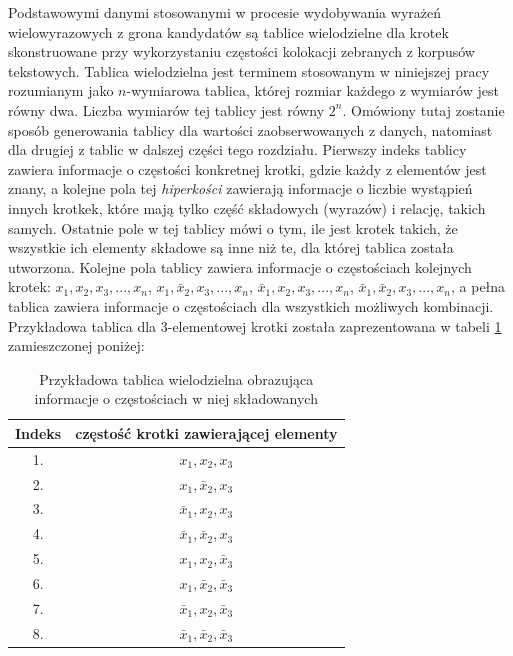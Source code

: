 \documentclass[11pt,a4paper]{llncs}
\begin{document}
Podstawowymi danymi stosowanymi w procesie wydobywania wyrażeń wielowyrazowych z grona kandydatów są tablice wielodzielne dla krotek skonstruowane przy wykorzystaniu częstości kolokacji zebranych z korpusów tekstowych.
Tablica wielodzielna jest terminem stosowanym w niniejszej pracy rozumianym jako $n$-wymiarowa tablica, której rozmiar każdego z wymiarów jest równy dwa.
Liczba wymiarów tej tablicy jest równy $ 2^{n} $.
Omówiony tutaj zostanie sposób generowania tablicy dla wartości zaobserwowanych z danych, natomiast dla drugiej z tablic w dalszej części tego rozdziału.
Pierwszy indeks tablicy zawiera informacje o częstości konkretnej krotki, gdzie każdy z elementów jest znany, a kolejne pola tej  \emph{hiperkości} zawierają informacje o liczbie wystąpień innych krotkek, które mają tylko część składowych (wyrazów) i relację, takich samych.
Ostatnie pole w tej tablicy mówi o tym, ile jest krotek takich, że wszystkie ich elementy składowe są inne niż te, dla której tablica została utworzona.
Kolejne pola tablicy zawiera informacje o częstościach kolejnych krotek: $ x_{1}, x_{2}, x_{3}, ..., x_{n} $, $ x_{1}, \bar{x}_{2}, x_{3}, ..., x_{n} $, $ \bar{x}_{1}, x_{2}, x_{3}, ..., x_{n} $, $ \bar{x}_{1}, \bar{x}_{2}, x_{3}, ..., x_{n} $, a pełna tablica zawiera informacje o częstościach dla wszystkich możliwych kombinacji.
Przykładowa tablica dla 3-elementowej krotki została zaprezentowana w tabeli \ref{observed_contingency_table} zamieszczonej poniżej:

\begin{table}[h!]
\centering
\begin{tabular}{c | c}
	\toprule
	Indeks	& częstość krotki zawierającej elementy									\\
	\midrule
	1. 		& \( x_{1}, 		x_{2}, 			x_{3} \)		\\
	2. 		& \( x_{1}, 		\bar{x}_{2}, 	x_{3} \)		\\
	3. 		& \( \bar{x}_{1}, 	x_{2}, 			x_{3} \)		\\
	4. 		& \( \bar{x}_{1}, 	\bar{x}_{2}, 	x_{3} \)		\\
	5. 		& \( x_{1}, 		x_{2}, 			\bar{x}_{3} \)	\\
	6. 		& \( x_{1}, 		\bar{x}_{2}, 	\bar{x}_{3} \)	\\
	7. 		& \( \bar{x}_{1}, 	x_{2}, 			\bar{x}_{3} \)	\\
	8. 		& \( \bar{x}_{1}, 	\bar{x}_{2}, 	\bar{x}_{3} \)	\\
	\bottomrule
\end{tabular}
\caption[Tablica wielodzielna dla krotki 3-elementowej]{Przykładowa tablica wielodzielna obrazująca informacje o częstościach w niej składowanych}
\label{observed_contingency_table}
\end{table}
\end{document}
